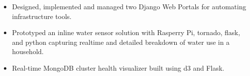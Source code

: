 \documentclass[10pt,a4paper,academicons]{altacv}
\begin{document}
\divider

\begin{itemize}
\item Designed, implemented and managed two Django Web Portals for automating infrastructure tools.
\end{itemize}


\begin{itemize}
\item Prototyped an inline water sensor solution with Rasperry Pi, tornado, flask, and python capturing realtime and detailed breakdown of water use in a household.
\end{itemize}
\divider

\begin{itemize}
\item Real-time MongoDB cluster health visualizer built using d3 and Flask.
\end{itemize}

\medskip
\end{document}
